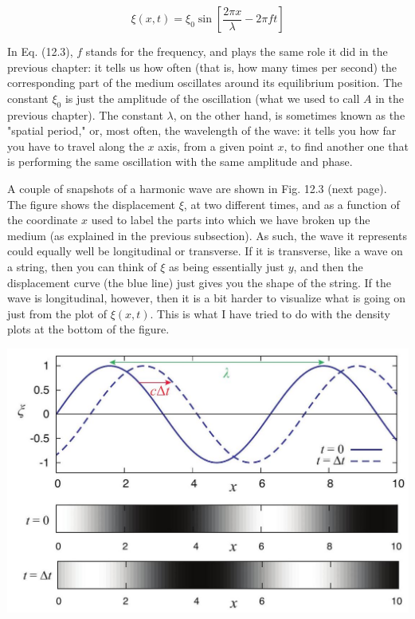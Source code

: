\documentclass[10pt]{article}
\begin{document}
\begin{equation*}
\xi(x, t)=\xi_{0} \sin \left[\frac{2 \pi x}{\lambda}-2 \pi f t\right] \tag{12.3}
\end{equation*}


In Eq. (12.3), $f$ stands for the frequency, and plays the same role it did in the previous chapter: it tells us how often (that is, how many times per second) the corresponding part of the medium oscillates around its equilibrium position. The constant $\xi_{0}$ is just the amplitude of the oscillation (what we used to call $A$ in the previous chapter). The constant $\lambda$, on the other hand, is sometimes known as the "spatial period," or, most often, the wavelength of the wave: it tells you how far you have to travel along the $x$ axis, from a given point $x$, to find another one that is performing the same oscillation with the same amplitude and phase.

A couple of snapshots of a harmonic wave are shown in Fig. 12.3 (next page). The figure shows the displacement $\xi$, at two different times, and as a function of the coordinate $x$ used to label the parts into which we have broken up the medium (as explained in the previous subsection). As such, the wave it represents could equally well be longitudinal or transverse. If it is transverse, like a wave on a string, then you can think of $\xi$ as being essentially just $y$, and then the displacement curve (the blue line) just gives you the shape of the string. If the wave is longitudinal, however, then it is a bit harder to visualize what is going on just from the plot of $\xi(x, t)$. This is what I have tried to do with the density plots at the bottom of the figure.

\begin{center}
\includegraphics[max width=\textwidth]{2024_09_14_9969b06773f10b6936e8g-301}
\end{center}
\end{document}
